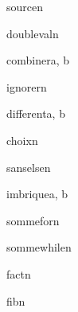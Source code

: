 \begin{algo}{source}{n}
\end{algo}

\begin{algo}{doubleval}{n}
\end{algo}

\begin{algo}{combiner}{a, b}
\end{algo}

\begin{algo}{ignorer}{n}
\end{algo}

\begin{algo}{different}{a, b}
  \ELSE
  \FI
\end{algo}

\begin{algo}{choix}{n}
  \ELSE
  \FI
\end{algo}

\begin{algo}{sanselse}{n}
  \FI
\end{algo}

\begin{algo}{imbrique}{a, b}
    \ELSE
    \FI
  \ELSE
  \FI
\end{algo}

\begin{algo}{sommefor}{n}
  \OD
\end{algo}

\begin{algo}{sommewhile}{n}
  \OD
\end{algo}

\begin{algo}{fact}{n}
  \ELSE
  \FI
\end{algo}

\begin{algo}{fib}{n}
  \ELSE
  \FI
\end{algo}

